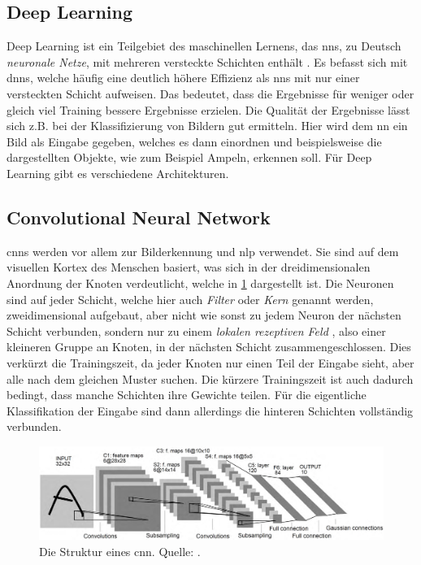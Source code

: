 \subsection{Deep Learning}
Deep Learning ist ein Teilgebiet des maschinellen Lernens, das \acp{nn}, zu Deutsch \emph{neuronale Netze}, mit mehreren versteckte Schichten enthält \citep{deeplearningreview}.
Es befasst sich mit \acp{dnn}, welche häufig eine deutlich höhere Effizienz als \acp{nn} mit nur einer versteckten Schicht aufweisen.
Das bedeutet, dass die Ergebnisse für weniger oder gleich viel Training bessere Ergebnisse erzielen.
Die Qualität der Ergebnisse lässt sich z.B. bei der Klassifizierung von Bildern gut ermitteln.
Hier wird dem \ac{nn} ein Bild als Eingabe gegeben, welches es dann einordnen und beispielsweise die dargestellten Objekte, wie zum Beispiel Ampeln, erkennen soll.
Für Deep Learning gibt es verschiedene Architekturen.

\subsection{Convolutional Neural Network}
\acp{cnn} werden vor allem zur Bilderkennung und \ac{nlp} verwendet.
Sie sind auf dem visuellen Kortex des Menschen basiert, was sich in der dreidimensionalen Anordnung der Knoten verdeutlicht,
welche in \cref{fig:struktur-cnn} dargestellt ist.
Die Neuronen sind auf jeder Schicht, welche hier auch \emph{Filter} oder \emph{Kern} genannt werden,
zweidimensional aufgebaut, aber nicht wie sonst zu jedem Neuron der nächsten Schicht verbunden,
sondern nur zu einem \emph{lokalen rezeptiven Feld} \citep{deeplearningnature},
also einer kleineren Gruppe an Knoten, in der nächsten Schicht zusammengeschlossen.
Dies verkürzt die Trainingszeit, da jeder Knoten nur einen Teil der Eingabe sieht, aber alle nach dem gleichen Muster suchen.
Die kürzere Trainingszeit ist auch dadurch bedingt, dass manche Schichten ihre Gewichte teilen.
Für die eigentliche Klassifikation der Eingabe sind dann allerdings die hinteren Schichten vollständig verbunden.
\begin{figure}%
\centering
\includegraphics[width=\textwidth, height=\textheight, keepaspectratio]{Images/CNN.png}
\caption[Struktur von CNNs]{Die Struktur eines \ac{cnn}. Quelle: \citet{deeplearningarchitecturesreview}.}
\label{fig:struktur-cnn}
\end{figure}

